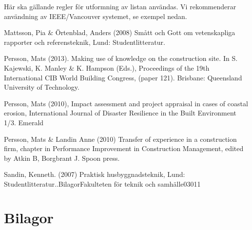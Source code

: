 \documentclass[11pt,a4paper]{article}
\begin{document}
\newpage
\begin{thebibliography}{99}

\item[]{Här ska gällande regler för utformning av listan användas. Vi rekommenderar användning av IEEE/Vancouver systemet, se exempel nedan.}

 Mattsson, Pia \& Örtenblad, Anders (2008) Smått
  och Gott om vetenskapliga rapporter och referensteknik, Lund:
  Studentlitteratur. 

Persson, Mats (2013). Making use of knowledge
  on the construction site. In S. Kajewski, K. Manley \& K. Hampson
  (Eds.), Proceedings of the 19th International CIB World Building
  Congress, (paper 121). Brisbane: Queensland University of
  Technology.

Persson, Mats (2010), Impact assessment and project
  appraisal in cases of coastal erosion, International Journal of
  Disaster Resilience in the Built Environment 1/3. Emerald

Persson, Mats \& Landin Anne (2010) Transfer of
  experience in a construction firm, chapter in Performance
  Improvement in Construction Management, edited by Atkin B, Borgbrant
  J. Spoon press.

  Sandin, Kenneth. (2007) Praktisk husbyggnadsteknik,
  Lund: Studentlitteratur..BilagorFakulteten för teknik och
  samhälle03011

\end{thebibliography}

\newpage
\section*{Bilagor}
%
\end{document}
